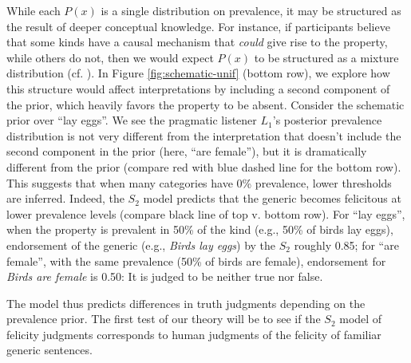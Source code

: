 \documentclass[12pt,letterpaper]{article}
\begin{document}
While each $P(x)$ is a single distribution on prevalence, it may be structured as the result of deeper conceptual knowledge. 
For instance, if participants believe that some kinds have a causal mechanism that \emph{could} give rise to the property, while others do not, then we would expect $P(x)$ to be structured as a mixture distribution (cf. ).
In Figure \ref{fig:schematic-unif} (bottom row), we explore how this structure would affect interpretations by including a second component of the prior, which heavily favors the property to be absent. 
Consider the schematic prior over ``lay eggs''.
We see the pragmatic listener $L_1$'s posterior prevalence distribution is not very different from the interpretation that doesn't include the second component in the prior (here, ``are female''), but it is dramatically different from the prior (compare red with blue dashed line for the bottom row).
This suggests that when many categories have 0\% prevalence, lower thresholds are inferred. 
Indeed, the $S_2$ model predicts that the generic becomes felicitous at lower prevalence levels (compare black line of top v. bottom row).
For ``lay eggs'', when the property is prevalent in 50\% of the kind (e.g., 50\% of birds lay eggs), endorsement of the generic (e.g., \emph{Birds lay eggs}) by the $S_2$ roughly 0.85; for ``are female'', with the same prevalence (50\% of birds are female), endorsement for \emph{Birds are female} is 0.50: It is judged to be neither true nor false.


%    



The model thus predicts differences in truth judgments depending on the prevalence prior. 
The first test of our theory will be to see if the $S_2$ model of felicity judgments corresponds to human judgments of the felicity of familiar generic sentences. 
\end{document}
